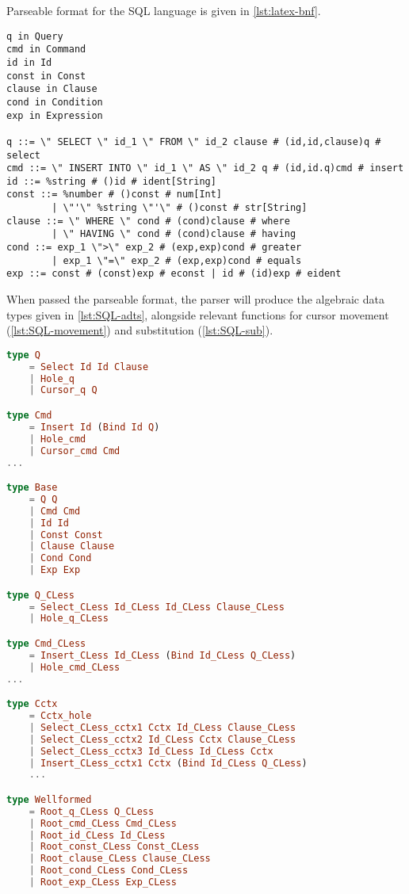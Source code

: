 Parseable format for the SQL language is given in \cref{lst:latex-bnf}.

\begin{lstlisting}[style=inline, caption={Parseable format of the SQL language syntax}, label={lst:SQL-bnf}]
q in Query
cmd in Command
id in Id
const in Const
clause in Clause
cond in Condition
exp in Expression

q ::= \" SELECT \" id_1 \" FROM \" id_2 clause # (id,id,clause)q # select
cmd ::= \" INSERT INTO \" id_1 \" AS \" id_2 q # (id,id.q)cmd # insert
id ::= %string # ()id # ident[String]
const ::= %number # ()const # num[Int] 
        | \"'\" %string \"'\" # ()const # str[String]
clause ::= \" WHERE \" cond # (cond)clause # where 
        | \" HAVING \" cond # (cond)clause # having
cond ::= exp_1 \">\" exp_2 # (exp,exp)cond # greater 
        | exp_1 \"=\" exp_2 # (exp,exp)cond # equals
exp ::= const # (const)exp # econst | id # (id)exp # eident
\end{lstlisting}

When passed the parseable format, the parser will produce the algebraic data types
given in \cref{lst:SQL-adts}, alongside relevant functions for cursor movement (\cref{lst:SQL-movement})
and substitution (\cref{lst:SQL-sub}).

\begin{lstlisting}[style=inline, language=elm, caption={Generated ADT for the SQL language}, label={lst:SQL-adts}]
type Q
    = Select Id Id Clause
    | Hole_q
    | Cursor_q Q

type Cmd
    = Insert Id (Bind Id Q)
    | Hole_cmd
    | Cursor_cmd Cmd
...

type Base
    = Q Q
    | Cmd Cmd
    | Id Id
    | Const Const
    | Clause Clause
    | Cond Cond
    | Exp Exp

type Q_CLess
    = Select_CLess Id_CLess Id_CLess Clause_CLess
    | Hole_q_CLess

type Cmd_CLess
    = Insert_CLess Id_CLess (Bind Id_CLess Q_CLess)
    | Hole_cmd_CLess
...

type Cctx
    = Cctx_hole
    | Select_CLess_cctx1 Cctx Id_CLess Clause_CLess
    | Select_CLess_cctx2 Id_CLess Cctx Clause_CLess
    | Select_CLess_cctx3 Id_CLess Id_CLess Cctx
    | Insert_CLess_cctx1 Cctx (Bind Id_CLess Q_CLess)
    ...

type Wellformed
    = Root_q_CLess Q_CLess
    | Root_cmd_CLess Cmd_CLess
    | Root_id_CLess Id_CLess
    | Root_const_CLess Const_CLess
    | Root_clause_CLess Clause_CLess
    | Root_cond_CLess Cond_CLess
    | Root_exp_CLess Exp_CLess
\end{lstlisting}

